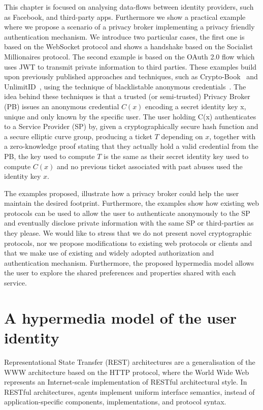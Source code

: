 This chapter is focused on analysing data-flows between identity providers, such as Facebook, and third-party apps. Furthermore we show a practical example where we propose a scenario of a privacy broker implementing a privacy friendly authentication mechanism. We introduce two particular cases, the first one is based on the WebSocket protocol and shows a handshake based on the Socialist Millionaires protocol. The second example is based on the OAuth 2.0 flow which uses JWT to transmit private information to third parties. These examples build upon previously published approaches and techniques, such as Crypto-Book~\cite{maheswaran2013crypto} and UnlimitID~\cite{isaakidis2016unlimitid}, using the technique of blacklistable anonymous credentials~\cite{tsang2007blacklistable}. The idea behind these techniques is that a trusted (or semi-trusted) Privacy Broker (PB) issues an anonymous credential $C(x)$ encoding a secret identity key x, unique and only known by the specific user. The user holding C(x) authenticates to a Service Provider (SP) by, given a cryptographically secure hash function and a secure elliptic curve group, producing a ticket $T$ depending on $x$, together with a zero-knowledge proof stating that they actually hold a valid credential from the PB, the key used to compute $T$ is the same as their secret identity key used to compute $C(x)$ and no previous ticket associated with past abuses used the identity key $x$. 

The examples proposed, illustrate how a privacy broker could help the user maintain the desired footprint. Furthermore, the examples show how existing web protocols can be used to allow the user to authenticate anonymously to the SP and eventually disclose private information with the same SP or third-parties as they please. We would like to stress that we do not present novel cryptographic protocols, nor we propose modifications to existing web protocols or clients and that we make use of existing and widely adopted authorization and authentication mechanism. Furthermore, the proposed hypermedia model allows the user to explore the shared preferences and properties shared with each service.

\section{A hypermedia model of the user identity}

Representational State Transfer (REST) architectures are a generalisation of the WWW architecture based on the HTTP protocol, where the World Wide Web represents an Internet-scale implementation of RESTful architectural style. In RESTful architectures, agents implement uniform interface semantics, instead of application-specific components, implementations, and protocol syntax. 

